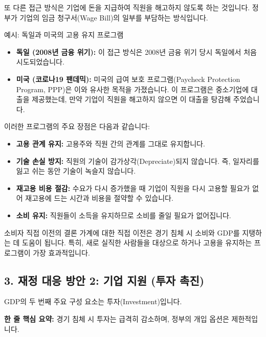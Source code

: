 \documentclass[11pt,a4paper]{article}
\begin{document}
또 다른 접근 방식은 기업에 돈을 지급하여 직원을 해고하지 않도록 하는 것입니다. 정부가 기업의 임금 청구서(Wage Bill)의 일부를 부담하는 방식입니다.

\begin{examplebox}{예시: 독일과 미국의 고용 유지 프로그램}
    \begin{itemize}
        \item \textbf{독일 (2008년 금융 위기):} 이 접근 방식은 2008년 금융 위기 당시 독일에서 처음 시도되었습니다.
        \item \textbf{미국 (코로나19 팬데믹):} 미국의 급여 보호 프로그램(Paycheck Protection Program, PPP)은 이와 유사한 목적을 가졌습니다. 이 프로그램은 중소기업에 대출을 제공했는데, 만약 기업이 직원을 해고하지 않으면 이 대출을 탕감해 주었습니다.
    \end{itemize}
\end{examplebox}

이러한 프로그램의 주요 장점은 다음과 같습니다:
\begin{itemize}
    \item \textbf{고용 관계 유지:} 고용주와 직원 간의 관계를 그대로 유지합니다.
    \item \textbf{기술 손실 방지:} 직원의 기술이 감가상각(Depreciate)되지 않습니다. 즉, 일자리를 잃고 쉬는 동안 기술이 녹슬지 않습니다.
    \item \textbf{재고용 비용 절감:} 수요가 다시 증가했을 때 기업이 직원을 다시 고용할 필요가 없어 재고용에 드는 시간과 비용을 절약할 수 있습니다.
    \item \textbf{소비 유지:} 직원들이 소득을 유지하므로 소비를 줄일 필요가 없어집니다.
\end{itemize}

\begin{summarybox}{소비자 직접 이전의 결론}
    가계에 대한 직접 이전은 경기 침체 시 소비와 GDP를 지탱하는 데 도움이 됩니다. 특히, 새로 실직한 사람들을 대상으로 하거나 고용을 유지하는 프로그램이 가장 효과적입니다.
\end{summarybox}

\newpage
\subsection*{3. 재정 대응 방안 2: 기업 지원 (투자 촉진)}

GDP의 두 번째 주요 구성 요소는 투자(Investment)입니다.

\begin{tcolorbox}[mybox={경기 침체 시 투자의 변화}]
    \textbf{한 줄 핵심 요약:} 경기 침체 시 투자는 급격히 감소하며, 정부의 개입 옵션은 제한적입니다.
\end{tcolorbox}
\end{document}
